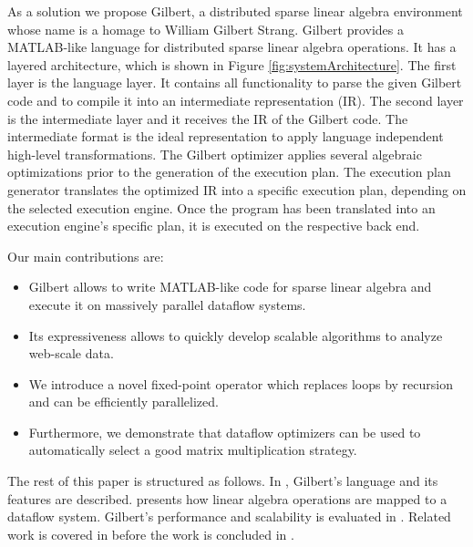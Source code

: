 As a solution we propose Gilbert, a distributed sparse linear algebra environment whose name is a homage to William Gilbert Strang.
Gilbert provides a MATLAB-like language for distributed sparse linear algebra operations. It has a layered architecture, which is shown in Figure \ref{fig:systemArchitecture}. The first layer is the language layer. It contains all functionality to parse the given Gilbert code and to compile it into an intermediate representation (IR). The second layer is the intermediate layer and it receives the IR of the Gilbert code. The intermediate format is the ideal representation to apply language independent high-level transformations. The Gilbert optimizer applies several algebraic optimizations prior to the generation of the execution plan. The execution plan generator translates the optimized IR into a specific execution plan, depending on the selected execution engine. Once the program has been translated into an execution engine's specific plan, it is executed on the respective back end. 

Our main contributions are:
\begin{itemize}
 \item Gilbert allows to write MATLAB-like code for sparse linear algebra and execute it on massively parallel dataflow systems.
 \item Its expressiveness allows to quickly develop scalable algorithms to analyze web-scale data.
 \item We introduce a novel fixed-point operator which replaces loops by recursion and can be efficiently parallelized.
 \item Furthermore, we demonstrate that dataflow optimizers can be used to automatically select a good matrix multiplication strategy. 
\end{itemize}

The rest of this paper is structured as follows.
In , Gilbert's language and its features are described.
 presents how linear algebra operations are mapped to a dataflow system. Gilbert's performance and scalability is evaluated in .
Related work is covered in  before the work is concluded in .
